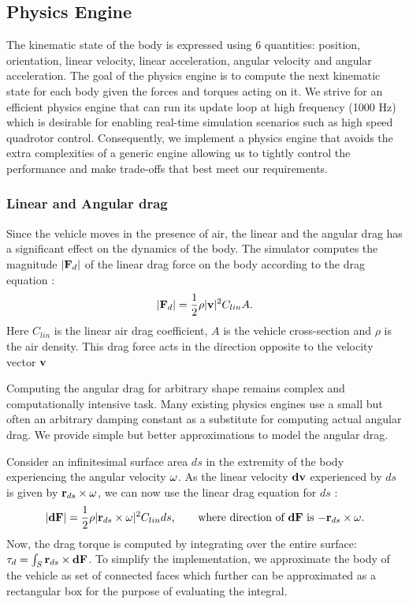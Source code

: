 \documentclass[graybox]{svmult}
\begin{document}
\subsection{Physics Engine}
The kinematic state of the body is expressed using 6 quantities: position, orientation, linear velocity, linear acceleration, angular velocity and angular acceleration. The goal of the physics engine is to compute the next kinematic state for each body given the forces and torques acting on it. We strive for an efficient physics engine that can run its update loop at high frequency (1000 Hz) which is desirable for enabling real-time simulation scenarios such as high speed quadrotor control. Consequently, we implement a physics engine that avoids the extra complexities of a generic engine allowing us to tightly control the performance and make trade-offs that best meet our requirements.

\subsubsection{Linear and Angular drag}
Since the vehicle moves in the presence of air, the linear and the angular drag has a significant effect on the dynamics of the body. The simulator computes the magnitude $|{\bf F}_d|$ of the linear drag force on the body according to the drag equation \cite{taylor2005classical}:
\begin{equation*}
	|{\bf F}_d| = \frac{1}{2}\rho |{\bf v}|^2 C_{lin} A.
\end{equation*}
Here $C_{lin}$ is the linear air drag coefficient, $A$ is the vehicle cross-section and $\rho$ is the air density. This drag force acts in the direction opposite to the velocity vector ${\bf v}$

Computing the angular drag for arbitrary shape remains complex and computationally intensive task. Many existing physics engines use a small but often an arbitrary damping constant as a substitute for computing actual angular drag. We provide simple but better approximations to model the angular drag.

Consider an infinitesimal surface area $ds$ in the extremity of the body experiencing the angular velocity ${\bf \omega}$. As the linear velocity ${\bf dv}$ experienced by $ds$ is given by ${\bf r}_{ds} \times {\bf \omega}$, we can now use the linear drag equation for $ds$ \cite[pp 160-161]{nakayama1998introduction}:
\begin{equation*}
	|{\bf dF}| = \frac{1}{2}\rho |{\bf r}_{ds} \times {\bf \omega}|^{2} C_{lin} {ds}
	\mbox{,\hspace{0.25in} where direction of ${\bf dF}$ is $-{\bf r}_{ds} \times {\bf \omega}$}.
\end{equation*}
Now, the drag torque is computed by integrating over the entire surface: ${\bf \tau}_{d} = \int_{S} {\bf r}_{ds} \times {\bf dF}$.
To simplify the implementation, we approximate the body of the vehicle as set of connected faces which further can be approximated as a rectangular box for the purpose of evaluating the integral.
\end{document}
